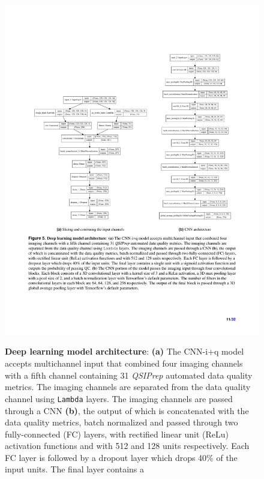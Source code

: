 \documentclass[fleqn,10pt,inline]{wlscirep}
\begin{document}
\begin{figure}[tbp]
    \centering
    {\label{fig:dl-architecture:complete}}
    {\label{fig:dl-architecture:cnn}}
    \includegraphics[width=\linewidth]{model_combined.pdf}
    \caption{%
        {\bf Deep learning model architecture}:
        \textbf{(a)} The CNN-i+q model accepts multichannel input that combined
        four imaging channels with a fifth channel containing 31 \emph{QSIPrep}
        automated data quality metrics. The imaging channels are separated from the data quality
        channel using \texttt{Lambda} layers. The imaging channels are passed
        through a CNN \textbf{(b)}, the output of which is concatenated with the
        data quality metrics, batch normalized and passed through two fully-connected (FC)
        layers, with rectified linear unit (ReLu) activation functions and with
        512 and 128 units respectively. Each FC layer is followed by a dropout
        layer which drops 40\% of the input units. The final layer contains a
}
\end{figure}
\end{document}
